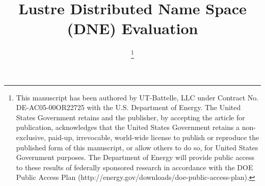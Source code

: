 \documentclass[conference,compsoc]{IEEEtran}
\begin{document}
%
\title{Lustre Distributed Name Space (DNE) Evaluation}


\author{
\thanks{
This manuscript has been authored by UT-Battelle, LLC under Contract No. DE-AC05-00OR22725 with the U.S. Department of Energy. The United States Government retains and the publisher, by accepting the article for publication, acknowledges that the United States Government retains a non-exclusive, paid-up, irrevocable, world-wide license to publish or reproduce the published form of this manuscript, or allow others to do so, for United States Government purposes. The Department of Energy will provide public access to these results of federally sponsored research in accordance with the DOE Public Access Plan (http://energy.gov/downloads/doe-public-access-plan).
}
}


%
\end{document}
